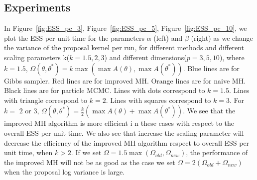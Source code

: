 
\subsection{Experiments}

 In Figure~\ref{fig:ESS_pc_3}, Figure~\ref{fig:ESS_pc_5}, Figure~\ref{fig:ESS_pc_10}, we plot the ESS per unit time for the parameters $\alpha$ (left) and $\beta$ (right) as we change the variance of the
  proposal kernel per run, for different methods and different scaling parameters k($k = 1.5, 2, 3$) and different dimensions($p = 3, 5, 10$), where   $k = 1.5$,  $\Omega(\theta, \theta^*) = k \max(\max A(\theta), \max A(\theta^*))$. Blue lines are for Gibbs sampler. Red lines are for improved MH. Orange lines are for naive MH. Black lines are for particle MCMC. Lines with dots correspond to $k = 1.5$. Lines with triangle correspond to $k = 2$. Lines with squares correspond to $k = 3$. For $k=$ $2$ or $3$, $\Omega(\theta, \theta^*) = \frac{k}{2} (\max A(\theta) + \max A(\theta^*))$. We see that the improved MH algorithm is more efficient i	n these cases with respect to the overall ESS per unit time. We also see that increase the scaling parameter will decrease the efficiency of the improved MH algorithm respect to overall ESS per unit time, when $k > 2$. If we set $\Omega = 1.5 \max(\Omega_{old}, \Omega_{new})$, the performance of the improved MH will not be as good as the case we set $\Omega = 2(\Omega_{old} + \Omega_{new})$ when the proposal log variance is large.\\

